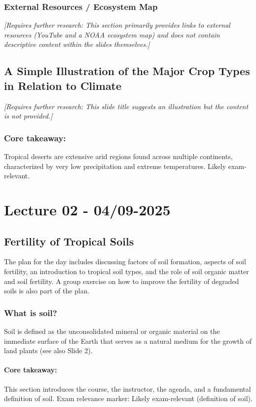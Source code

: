 \subsubsection*{External Resources / Ecosystem Map} 
\textit{[Requires further research: This section primarily provides links to external resources (YouTube and a NOAA ecosystem map) and does not contain descriptive content within the slides themselves.]}

\subsection{A Simple Illustration of the Major Crop Types in Relation to Climate} 
\textit{[Requires further research: This slide title suggests an illustration but the content is not provided.]}

\subsubsection*{Core takeaway:} 
Tropical deserts are extensive arid regions found across multiple continents, characterized by very low precipitation and extreme temperatures. Likely exam-relevant.

\section{Lecture 02 - 04/09-2025}
\subsection{Fertility of Tropical Soils}
The plan for the day includes discussing factors of soil formation, aspects of soil fertility, an introduction to tropical soil types, and the role of soil organic matter and soil fertility. A group exercise on how to improve the fertility of degraded soils is also part of the plan.

\subsubsection*{What is soil?} 
Soil is defined as the unconsolidated mineral or organic material on the immediate surface of the Earth that serves as a natural medium for the growth of land plants (see also Slide 2).

\paragraph*{Core takeaway:} This section introduces the course, the instructor, the agenda, and a fundamental definition of soil. Exam relevance marker: Likely exam-relevant (definition of soil).


